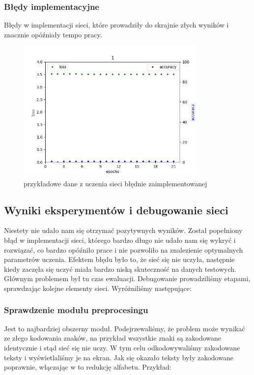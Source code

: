 \newpage
\subsubsection{Błędy implementacyjne}
Błędy w implementacji sieci, które prowadziły do skrajnie złych wyników i znacznie opóźniały tempo pracy.
\begin{figure}[H]
	\centering
	\includegraphics[height=7cm]{./images/result1.png}
	\caption{przykładowe dane z uczenia sieci błędnie zaimplementowanej}
	\label{fig:test5}
	\end{figure}

\subsection{Wyniki eksperymentów i debugowanie sieci}
Niestety nie udało nam się otrzymać pozytywnych wyników. Został popełniony błąd w implementacji sieci,
którego bardzo długo nie udało nam się wykryć i rozwiązać, co bardzo opóźniło prace i nie pozwoliło na znalezienie
optymalnych parametrów uczenia. Efektem błędu było to, że sieć się nie uczyła, następnie kiedy zaczęła się 
uczyć miała bardzo niską skuteczność na danych testowych. Głównym problemem był tu czas ewaluacji. 
Debugowanie prowadziliśmy etapami, sprawdzając kolejne elementy sieci. Wyróżniliśmy następujące:

\subsubsection{Sprawdzenie modułu preprocesingu}
	Jest to najbardziej obszerny moduł. Podejrzewaliśmy, że problem może wynikać ze złego kodowania znaków,
	na przykład wszystkie znaki są zakodowane identycznie i stąd sieć się nie uczy. W tym celu odkodowywaliśmy
	zakodowane teksty i wyświetlaliśmy je na ekran. Jak się okazało teksty były zakodowane poprawnie, włączając w
	to redukcję alfabetu. Przykład:
	

